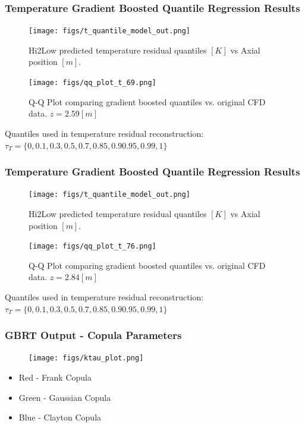 \documentclass[t, pdftex]{beamer}
\begin{document}
\begin{frame}\frametitle{Temperature Gradient Boosted Quantile Regression Results}
    \begin{figure}
        \centering
        \begin{minipage}{.5\textwidth}
            \centering
            \texttt{[image: figs/t\_quantile\_model\_out.png]}
            \caption{Hi2Low predicted temperature residual quantiles $[K]$ vs Axial position $[m]$.}
        \end{minipage}%
        \begin{minipage}{.5\textwidth}
            \centering
            \texttt{[image: figs/qq\_plot\_t\_69.png]}
            \caption{Q-Q Plot comparing gradient boosted quantiles vs. original CFD data. $z=2.59[m]$}
        \end{minipage}
    \end{figure}
Quantiles used in temperature residual reconstruction: $\tau_{T}=\{0, 0.1, 0.3, 0.5, 0.7, 0.85, 0.9 0.95, 0.99, 1\}$
\end{frame}

\begin{frame}\frametitle{Temperature Gradient Boosted Quantile Regression Results}
    \begin{figure}
        \centering
        \begin{minipage}{.5\textwidth}
            \centering
            \texttt{[image: figs/t\_quantile\_model\_out.png]}
            \caption{Hi2Low predicted temperature residual quantiles $[K]$ vs Axial position $[m]$.}
        \end{minipage}%
        \begin{minipage}{.5\textwidth}
            \centering
            \texttt{[image: figs/qq\_plot\_t\_76.png]}
            \caption{Q-Q Plot comparing gradient boosted quantiles vs. original CFD data. $z=2.84[m]$}
        \end{minipage}
    \end{figure}
Quantiles used in temperature residual reconstruction: $\tau_{T}=\{0, 0.1, 0.3, 0.5, 0.7, 0.85, 0.9 0.95, 0.99, 1\}$
\end{frame}

\begin{frame}\frametitle{GBRT Output - Copula Parameters}
\begin{figure}[!htbp]
\centering
\texttt{[image: figs/ktau\_plot.png]}
\label{model_overview}
\end{figure}
\begin{itemize}
\item Red - Frank Copula
\item Green - Gaussian Copula
\item Blue - Clayton Copula
\end{itemize}
\end{frame}
\end{document}
